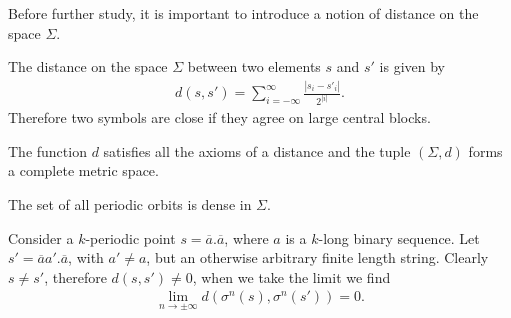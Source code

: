 Before further study, it is important to introduce a notion of distance on the space $\Sigma$.
\begin{definition}
	The distance on the space $\Sigma$ between two elements $s$ and $s'$ is given by
	\begin{align}
		d(s,s') = \sum_{i=-\infty }^{\infty } \frac{|s_i - s'_i |}{2^{|i|}}.
	\end{align}
Therefore two symbols are close if they agree on large central blocks.	
\end{definition}
\begin{remark}[]
	The function $d$ satisfies all the axioms of a distance and the tuple $(\Sigma, d) $ forms a complete metric space. 
\end{remark}

\begin{proposition}
The set of all periodic orbits is dense in $\Sigma$.	
\end{proposition}
\begin{proposition}[]
	Consider a $k$-periodic point $s=\overline{a}\bm{.} \overline{a}$, where $a$ is a $k$-long binary sequence. Let $s' = \overline{a}a'\bm{.} \overline{a}$, with $a' \neq a$, but an otherwise arbitrary finite length string. Clearly $s \neq s'$, therefore $d(s,s') \neq 0$, when we take the limit we find
\begin{align}
	\lim_{n\to \pm \infty }	d(\sigma^{n}(s), \sigma^{n}(s')) = 0.
\end{align}
\end{proposition}


